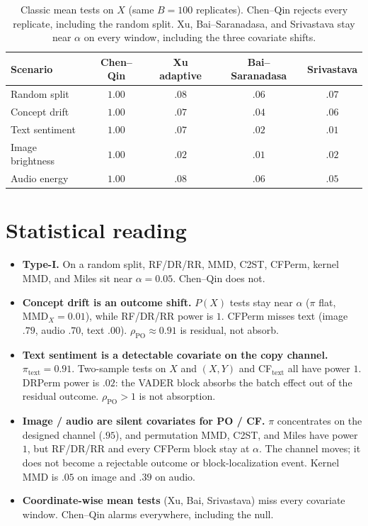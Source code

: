 \documentclass[11pt]{article}
\begin{document}
\begin{table}[ht]
\centering
\caption{Classic mean tests on $X$ (same $B{=}100$ replicates).
Chen--Qin rejects every replicate, including the random split.
Xu, Bai--Saranadasa, and Srivastava stay near $\alpha$ on every window,
including the three covariate shifts.}
\label{tab:modasense_classic}
\begin{tabular}{lcccc}
\toprule
Scenario & Chen--Qin & Xu adaptive & Bai--Saranadasa & Srivastava \\
\midrule
Random split     & $1.00$ & $.08$ & $.06$ & $.07$ \\
Concept drift    & $1.00$ & $.07$ & $.04$ & $.06$ \\
Text sentiment   & $1.00$ & $.07$ & $.02$ & $.01$ \\
Image brightness & $1.00$ & $.02$ & $.01$ & $.02$ \\
Audio energy     & $1.00$ & $.08$ & $.06$ & $.05$ \\
\bottomrule
\end{tabular}
\end{table}

\section*{Statistical reading}
\begin{itemize}
  \item \textbf{Type-I.} On a random split, RF/DR/RR, MMD, C2ST, CFPerm,
        kernel MMD, and Miles sit near $\alpha{=}0.05$. Chen--Qin does not.
  \item \textbf{Concept drift is an outcome shift.}
        $P(X)$ tests stay near $\alpha$ ($\pi$ flat, MMD$_X{=}0.01$),
        while RF/DR/RR power is $1$. CFPerm misses text
        (image $.79$, audio $.70$, text $.00$).
        $\rho_{\mathrm{PO}}{\approx}0.91$ is residual, not absorb.
  \item \textbf{Text sentiment is a detectable covariate on the copy channel.}
        $\pi_{\mathrm{text}}{=}0.91$. Two-sample tests on $X$ and $(X,Y)$
        and CF$_{\mathrm{text}}$ all have power $1$.
        DRPerm power is $.02$: the VADER block absorbs the batch effect
        out of the residual outcome. $\rho_{\mathrm{PO}}{>}1$ is not absorption.
  \item \textbf{Image / audio are silent covariates for PO / CF.}
        $\pi$ concentrates on the designed channel ($.95$), and permutation
        MMD, C2ST, and Miles have power $1$, but RF/DR/RR and every CFPerm
        block stay at $\alpha$. The channel moves; it does not become a
        rejectable outcome or block-localization event.
        Kernel MMD is $.05$ on image and $.39$ on audio.
  \item \textbf{Coordinate-wise mean tests} (Xu, Bai, Srivastava) miss every
        covariate window. Chen--Qin alarms everywhere, including the null.
\end{itemize}
\end{document}
